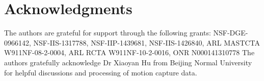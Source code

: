 \documentclass[10pt,journal,cspaper,compsoc]{IEEEtran}
\begin{document}
\vspace{-2em}
\section*{Acknowledgments}
The authors are grateful for support through the following grants:
NSF-DGE-0966142, NSF-IIS-1317788, NSF-IIP-1439681, NSF-IIS-1426840,
ARL MASTCTA W911NF-08-2-0004, ARL RCTA W911NF-10-2-0016, ONR N000141310778
The authors gratefully acknowledge Dr Xiaoyan Hu from Beijing Normal University
for helpful discussions and processing of motion capture data.




\end{document}
